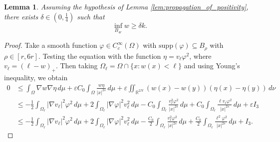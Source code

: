 \documentclass[11pt]{article}
\newtheorem{lemma}{Lemma}[section] %
\newcommand{\om} {\Omega}
\begin{document}
\begin{lemma}\label{lem:lower_bound_Harnack}
Assuming the hypothesis of Lemma \ref{lem:propagation_of_positivity}, there exists $\delta \in (0, \tfrac{1}{4})$ such that
\begin{equation*} 
    \inf_{B_{4r}} w \geq \delta k.
\end{equation*}
\end{lemma}
\begin{proof}
Take a smooth function $\varphi \in C_c^{\infty}(\om)$ with $\text{supp}(\varphi) \subseteq B_{\rho}$ with $\rho \in [r,6r]$. Testing the equation with the function $\eta = v_{\ell} \varphi^2$, where $v_{\ell} = (\ell - w)_+$. Then taking $\Omega_\ell = \Omega \cap \{x :  w(x) < \ell \}$ and using Young's inequality, we obtain
\begin{align*}
    0 &\leq \int_{\Omega} \nabla w   \nabla \eta  \, d\mu +\varepsilon C_0 \int_{\Omega} \frac{w \eta}{|x|^{2s}} \, d\mu 
    + \varepsilon\iint_{\mathbb{R}^{2N}} (w(x) - w(y)) (\eta(x) - \eta(y)) \, d\nu \\
    & \leq  -\frac{1}{2} \int_{\om_{\ell}} |\nabla v_{\ell}|^2 \varphi^2 \, d\mu 
+ 2 \int_{\om_{\ell}} |\nabla \varphi|^2 v_{\ell}^2 \, d\mu  -C_0 \int_{\om_{\ell}} \frac{v_{\ell}^2 \varphi^2}{|x|^{2s}} \, d\mu 
+ C_0 \int_{\om_{\ell}} \frac{\ell v_{\ell} \varphi^2}{|x|^{2s}} \, d\mu + \varepsilon I_3 \\
& \leq  -\frac{1}{2} \int_{\om_{\ell}} |\nabla v_{\ell}|^2 \varphi^2 \, d\mu 
+ 2 \int_{\om_{\ell}} |\nabla \varphi|^2 v_{\ell}^2 \, d\mu -\frac{C_0}{2} \int_{\om_{\ell}} \frac{v_{\ell}^2 \varphi^2}{|x|^{2s}} \, d\mu 
+ \frac{C_0}{2} \int_{\om_{\ell}} \frac{\ell^2 \varphi^2}{|x|^{2s}} \, d\mu + I_3.
\end{align*}

\end{proof}
\end{document}
